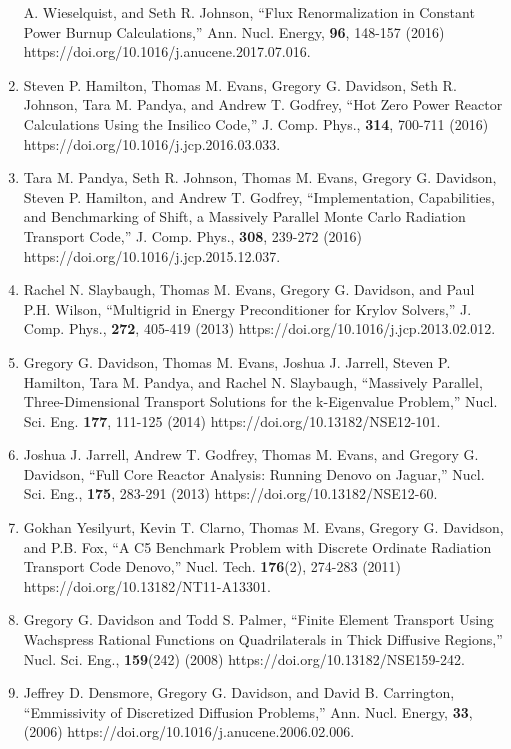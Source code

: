 \documentclass[letterpaper,11pt]{article}
\begin{document}
\begin{enumerate}
    A. Wieselquist, and Seth R. Johnson, ``Flux Renormalization in
    Constant Power Burnup Calculations,'' Ann. Nucl. Energy,
    \textbf{96}, 148-157 (2016)
    https://doi.org/10.1016/j.anucene.2017.07.016.
  \item Steven P. Hamilton, Thomas M. Evans, Gregory G. Davidson, Seth
    R. Johnson, Tara M. Pandya, and Andrew T. Godfrey, ``Hot Zero
    Power Reactor Calculations Using the Insilico Code,''
    J. Comp. Phys., \textbf{314}, 700-711 (2016)
    https://doi.org/10.1016/j.jcp.2016.03.033.
  \item Tara M. Pandya, Seth R. Johnson, Thomas M. Evans, Gregory
    G. Davidson, Steven P. Hamilton, and Andrew T. Godfrey,
    ``Implementation, Capabilities, and Benchmarking of Shift, a
    Massively Parallel Monte Carlo Radiation Transport Code,''
    J. Comp. Phys., \textbf{308}, 239-272 (2016)
    https://doi.org/10.1016/j.jcp.2015.12.037.
  \item Rachel N. Slaybaugh, Thomas M. Evans, Gregory G. Davidson, and
    Paul P.H. Wilson, ``Multigrid in Energy Preconditioner for Krylov
    Solvers,'' J. Comp. Phys., \textbf{272}, 405-419 (2013)
    https://doi.org/10.1016/j.jcp.2013.02.012.
  \item Gregory G. Davidson, Thomas M. Evans, Joshua J. Jarrell,
    Steven P. Hamilton, Tara M. Pandya, and Rachel N. Slaybaugh, ``Massively
    Parallel, Three-Dimensional Transport Solutions for the
    k-Eigenvalue Problem,'' Nucl. Sci. Eng. \textbf{177}, 111-125
    (2014) https://doi.org/10.13182/NSE12-101.
  \item Joshua J. Jarrell, Andrew T. Godfrey, Thomas M. Evans, and
    Gregory G. Davidson, ``Full Core Reactor Analysis: Running Denovo
    on Jaguar,'' Nucl. Sci. Eng., \textbf{175}, 283-291 (2013)
    https://doi.org/10.13182/NSE12-60.
  \item Gokhan Yesilyurt, Kevin T. Clarno, Thomas M. Evans, Gregory
    G. Davidson, and P.B. Fox, ``A C5 Benchmark Problem with Discrete
    Ordinate Radiation Transport Code Denovo,''
    Nucl. Tech. \textbf{176}(2), 274-283 (2011)
    https://doi.org/10.13182/NT11-A13301.
  \item Gregory G. Davidson and Todd S. Palmer, ``Finite Element
    Transport Using Wachspress Rational Functions on Quadrilaterals in
    Thick Diffusive Regions,'' Nucl. Sci. Eng., \textbf{159}(242)
    (2008) https://doi.org/10.13182/NSE159-242.
  \item Jeffrey D. Densmore, Gregory G. Davidson, and David
    B. Carrington, ``Emmissivity of Discretized Diffusion Problems,''
    Ann. Nucl. Energy, \textbf{33}, (2006)
    https://doi.org/10.1016/j.anucene.2006.02.006.
\end{enumerate}
\end{document}
